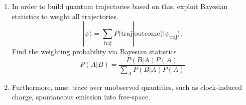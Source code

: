 \begin{enumerate}
  \item In order to build quantum trajectories based on this, exploit Bayesian statistics
    to weight all trajectories.  
    \begin{equation}
      |\psi\rangle = \sum_{\text{traj}} P(\text{traj}|\text{outcome})|\psi_{\text{traj}}\rangle.
    \end{equation}
    Find the weighting probability via Bayesian statistics
    \begin{equation}
      P(A|B) = \frac{P(B|A)P(A)}{\sum_AP(B|A)P(A)}
    \end{equation}
  \item Furthermore, must trace over unobserved quantities, such as clock-induced 
    charge, spontaneous emission into free-space.  
\end{enumerate}



